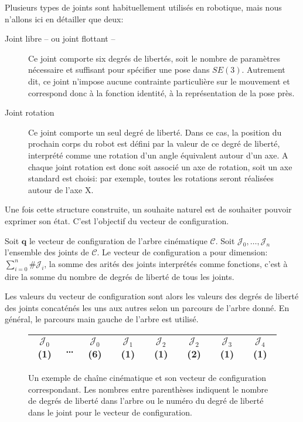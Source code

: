 Plusieurs types de joints sont habituellement utilisés en robotique,
mais nous n'allons ici en détailler que deux:
\begin{description}
\item[Joint libre -- ou joint flottant --] Ce joint comporte six degrés de libertés, soit le
  nombre de paramètres nécessaire et suffisant pour spécifier une pose
  dans $SE(3)$. Autrement dit, ce joint n'impose aucune contrainte
  particulière sur le mouvement et correspond donc à la fonction
  identité, à la représentation de la pose près.
\item[Joint rotation] Ce joint comporte un seul degré de liberté. Dans
  ce cas, la position du prochain corps du robot est défini par la
  valeur de ce degré de liberté, interprété comme une rotation d'un
  angle équivalent autour d'un axe. A chaque joint rotation est donc
  soit associé un axe de rotation, soit un axe standard est choisi:
  par exemple, toutes les rotations seront réalisées autour de l'axe
  X.
\end{description}


Une fois cette structure construite, un souhaite naturel est de
souhaiter pouvoir exprimer son état. C'est l'objectif du vecteur de
configuration.

\begin{mydef}
  Soit $\mathbf{q}$ le vecteur de configuration de l'arbre cinématique
  $\mathcal{C}$. Soit $\mathcal{J}_0, \dotsc, \mathcal{J}_n$
  l'ensemble des joints de $\mathcal{C}$. Le vecteur de configuration
  a pour dimension: $\sum_{i=0}^n \#\mathcal{J}_i$, la somme des arités
  des joints interprétés comme fonctions, c'est à dire la somme du
  nombre de degrés de liberté de tous les joints.


  Les valeurs du vecteur de configuration sont alors les valeurs des
  degrés de liberté des joints concaténés les uns aux autres selon un
  parcours de l'arbre donné. En général, le parcours main gauche de
  l'arbre est utilisé.
\end{mydef}

\begin{figure}[htbp!]
  \begin{center}

  \begin{tabular}{|ccc|c|cc|c|c|}
    \hline
    $\mathcal{J}_0$ (1) & \ldots & $\mathcal{J}_0$ (6)
    & $\mathcal{J}_1$ (1) & $\mathcal{J}_2$ (1) & $\mathcal{J}_2$ (2) & $\mathcal{J}_3$ (1) & $\mathcal{J}_4$ (1)\\
    \hline
  \end{tabular}
  \end{center}

  \caption{Un exemple de chaîne cinématique et son vecteur de
    configuration correspondant. Les nombres entre parenthèses
    indiquent le nombre de degrés de liberté dans l'arbre ou le numéro
    du degré de liberté dans le joint pour le vecteur de
    configuration.}
\end{figure}

